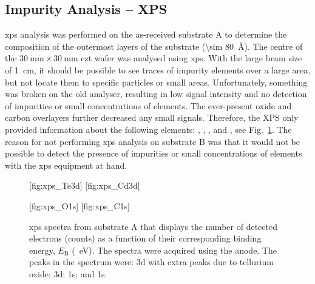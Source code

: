
\subsection{Impurity Analysis -- XPS}

\Ac{xps} analysis was performed on the as-received substrate A to determine the composition of the outermost layers of the substrate (\SI{\sim 80}{\angstrom}). The centre of the $\SI{30}{\milli\metre}\times\SI{30}{\milli\metre}$ \ac{czt} wafer was analysed using \ac{xps}. With the large beam size of \SI{1}{\centi\metre}, it should be possible to see traces of impurity elements over a large area, but not locate them to specific particles or small areas. Unfortunately, something was broken on the old analyser, resulting in low signal intensity and no detection of impurities or small concentrations of elements. The ever-present oxide and carbon overlayers further decreased any small signals. Therefore, the XPS only provided information about the following elements: , , , and , see Fig.~\ref{fig:xps_spectra}. The reason for not performing \ac{xps} analysis on substrate B was that it would not be possible to detect the presence of impurities or small concentrations of elements with the \ac{xps} equipment at hand.

\begin{figure}[htbp]
    \centering
    [fig:xps_Te3d]
    \hfill
    [fig:xps_Cd3d]
    \par\bigskip
    [fig:xps_O1s]
    \hfill
    [fig:xps_C1s]
    \caption[\Ac{xps} spectra from substrate A.]{\Ac{xps} spectra from substrate A that displays the number of detected electrons (counts) as a function of their corresponding binding energy, $E_\mathrm{B}$ (\SI{}{\electronvolt}). The spectra were acquired using the  anode. The peaks in the spectrum were:   3d with extra peaks due to tellurium oxide;   3d;   1s; and   1s.}
    \label{fig:xps_spectra}
\end{figure}
 
